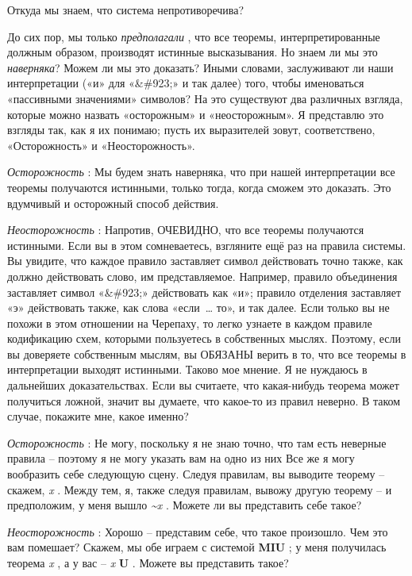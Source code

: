 \documentclass[../main.tex]{subfiles}
\begin{document}
Откуда мы знаем, что система непротиворечива?

До сих пор, мы только \emph{предполагали} , что все теоремы, интерпретированные должным образом, производят истинные высказывания. Но знаем ли мы это \emph{наверняка}? Можем ли мы это доказать? Иными словами, заслуживают ли наши интерпретации («и» для «\&\#923;» и так далее) того, чтобы именоваться «пассивными значениями» символов? На это существуют два различных взгляда, которые можно назвать «осторожным» и «неосторожным». Я представлю это взгляды так, как я их понимаю; пусть их выразителей зовут, соответствено, «Осторожность» и «Неосторожность».

\emph{Осторожность} : Мы будем знать наверняка, что при нашей интерпретации все теоремы получаются истинными, только тогда, когда сможем это доказать. Это вдумчивый и осторожный способ действия.

\emph{Неосторожность} : Напротив, ОЧЕВИДНО, что все теоремы получаются истинными. Если вы в этом сомневаетесь, взгляните ещё раз на правила системы. Вы увидите, что каждое правило заставляет символ действовать точно также, как должно действовать слово, им представляемое. Например, правило объединения заставляет символ «\&\#923;» действовать как «и»; правило отделения заставляет «э» действовать также, как слова «если~\ldots{} то», и так далее. Если только вы не похожи в этом отношении на Черепаху, то легко узнаете в каждом правиле кодификацию схем, которыми пользуетесь в собственных мыслях. Поэтому, если вы доверяете собственным мыслям, вы ОБЯЗАНЫ верить в то, что все теоремы в интерпретации выходят истинными. Таково мое мнение. Я не нуждаюсь в дальнейших доказательствах. Если вы считаете, что какая-нибудь теорема может получиться ложной, значит вы думаете, что какое-то из правил неверно. В таком случае, покажите мне, какое именно?

\emph{Осторожность} : Не могу, поскольку я не знаю точно, что там есть неверные правила \--- поэтому я не могу указать вам на одно из них Все же я могу вообразить себе следующую сцену. Следуя правилам, вы выводите теорему \--- скажем, \emph{x} . Между тем, я, также следуя правилам, вывожу другую теорему \--- и предположим, у меня вышло \emph{\textasciitilde x} . Можете ли вы представить себе такое?

\emph{Неосторожность} : Хорошо \--- представим себе, что такое произошло. Чем это вам помешает? Скажем, мы обе играем с системой \textbf{MIU} ; у меня получилась теорема \emph{x} , а у вас \--- \emph{x} \textbf{U} . Можете вы представить такое?
\end{document}
